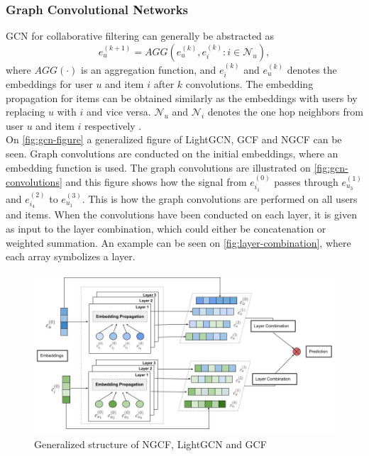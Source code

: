 \subsubsection{Graph Convolutional Networks}
GCN for collaborative filtering can generally be abstracted as \cite{BiTGCF}
\begin{equation}
    e_u^{(k+1)} = AGG(e_u^{(k)},e_i^{(k)} : i \in \mathcal{N}_u),
\end{equation}
where $AGG(\cdot)$ is an aggregation function, and $e_i^{(k)}$ and $e_u^{(k)}$ denotes the embeddings for user $u$ and item $i$ after $k$ convolutions.
The embedding propagation for items can be obtained similarly as the embeddings with users by replacing $u$ with $i$ and vice versa.
$\mathcal{N}_u$ and $\mathcal{N}_i$ denotes the one hop neighbors from user $u$ and item $i$ respectively \cite{lightgcn,BiTGCF,NGCF_2019}.\\
On \autoref{fig:gcn-figure} a generalized figure of LightGCN, GCF and NGCF can be seen.
Graph convolutions are conducted on the initial embeddings, where an embedding function is used.
The graph convolutions are illustrated on \autoref{fig:gcn-convolutions} and this figure shows how the signal from $e_{i_1}^{(0)}$ passes through $e_{u_3}^{(1)}$ and $e_{i_4}^{(2)}$ to $e_{u_1}^{(3)}$.
This is how the graph convolutions are performed on all users and items.
When the convolutions have been conducted on each layer, it is given as input to the layer combination, which could either be concatenation or weighted summation.
An example can be seen on \autoref{fig:layer-combination}, where each array symbolizes a layer.
\begin{figure}[h!]
    \includegraphics[width=1.1\textwidth]{figures/generalized-gcn-figure.PNG}
    \centering
    \caption{Generalized structure of NGCF, LightGCN and GCF}
    \label{fig:gcn-figure}
\end{figure}
